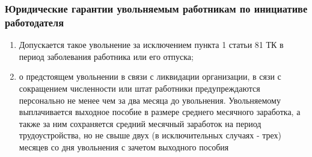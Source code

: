 \subsubsection{Юридические гарантии увольняемым работникам по инициативе работодателя}
\begin{enumerate}
	\item Допускается такое увольнение за исключением пункта 1 статьи 81 ТК в период заболевания работника или его отпуска;
	\item о предстоящем увольнении в связи с ликвидации организации, в сязи с сокращением численности или штат работники предупреждаются персонально не менее чем за два месяца до увольнения. Увольняемому выплачивается выходное пособие в размере среднего месячного заработка, а также за ним сохраняется средний месячный заработок на период трудоустройства, но не свыше двух (в исключительных случаях - трех) месяцев со дня увольнения с зачетом выходного пособия 
\end{enumerate}
